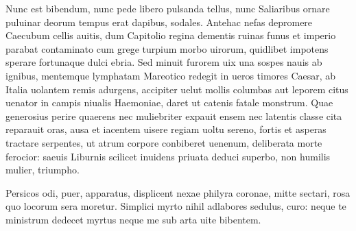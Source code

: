 \documentclass{book}
\newenvironment {carmen} [1] [\relax] 
  {\Titulus \Versus \incipit*\numerus{1}#1}
  {\endVersus}
\newcommand {\Sapphic}   {\Forma \strophae {0 \poena 00 \poena 1}}
\newcommand {\Alcaic}    {\Forma \strophae {0 \poena 01 \poena 2}}
\begin{document}
\begin{carmen}[\Alcaic]


 Nunc est bibendum, nunc pede libero
 pulsanda tellus, nunc Saliaribus
      ornare puluinar deorum
      tempus erat dapibus, sodales.
 Antehac nefas depromere Caecubum               
 cellis auitis, dum Capitolio
      regina dementis ruinas
      funus et imperio parabat
 contaminato cum grege turpium
 morbo uirorum, quidlibet impotens               
      sperare fortunaque dulci
      ebria. Sed minuit furorem
 uix una sospes nauis ab ignibus,
 mentemque lymphatam Mareotico
 redegit in ueros timores               
      Caesar, ab Italia uolantem
 remis adurgens, accipiter uelut
 mollis columbas aut leporem citus
      uenator in campis niualis
       Haemoniae, daret ut catenis               
 fatale monstrum. Quae generosius
 perire quaerens nec muliebriter
      expauit ensem nec latentis
      classe cita reparauit oras,
 ausa et iacentem uisere regiam               
 uoltu sereno, fortis et asperas
      tractare serpentes, ut atrum
      corpore conbiberet uenenum,
 deliberata morte ferocior:
 saeuis Liburnis scilicet inuidens               
      priuata deduci superbo,
      non humilis mulier, triumpho. 

\end{carmen}

\begin{carmen}[\Sapphic]


 Persicos odi, puer, apparatus,
 displicent nexae philyra coronae,
 mitte sectari, rosa quo locorum
      sera moretur.
 Simplici myrto nihil adlabores               
 sedulus, curo: neque te ministrum
 dedecet myrtus neque me sub arta
      uite bibentem.

 
\end{carmen}

\desinitLiber

\Liber
\end{document}
